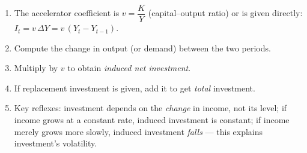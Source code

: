 \documentclass[11pt]{article}
\newcommand{\cle}[1]{{\popxbold\color{popdark}#1}}
\begin{document}
\begin{methode}
\begin{enumerate}
\item The \cle{accelerator} coefficient is $v = \dfrac{K}{Y}$ (capital--output ratio) or is given directly: $I_t = v\,\Delta Y = v\,(Y_t - Y_{t-1})$.
\item Compute the change in output (or demand) between the two periods.
\item Multiply by $v$ to obtain \emph{induced net investment}.
\item If replacement investment is given, add it to get \emph{total} investment.
\item Key reflexes: investment depends on the \emph{change} in income, not its level; if income grows at a constant rate, induced investment is constant; if income merely grows more slowly, induced investment \emph{falls} — this explains investment's volatility.
\end{enumerate}
\end{methode}
\end{document}
